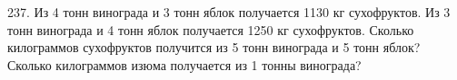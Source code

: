 237. Из 4 тонн винограда и 3 тонн яблок получается 1130 кг сухофруктов. Из 3 тонн винограда и 4 тонн яблок получается 1250 кг сухофруктов. Сколько килограммов сухофруктов получится из 5 тонн винограда и 5 тонн яблок? Сколько килограммов изюма получается из 1 тонны винограда?\\
